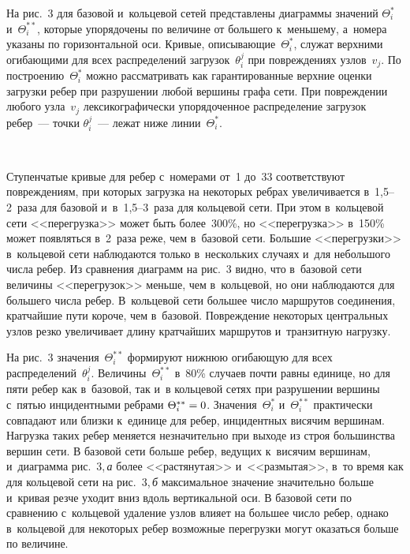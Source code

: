 \begin{multicols}{2}
На рис.~3 для базовой и~кольцевой сетей представлены диаграммы значений 
$\Theta_i^{*}$ и~$\Theta_i^{**}$, которые упорядочены по величине от большего 
к~меньшему, а~номера указаны по горизонтальной оси. Кривые, описывающие~$\Theta_i^{*}$, 
служат верхними огибающими для всех распределений загрузок~$\theta_i^{j}$ 
при по\-вреж\-де\-ни\-ях узлов~$v_j$. По построению~$\Theta_i^{*}$ можно 
рассматривать как гарантированные верхние оценки загрузки ребер при разрушении 
любой вершины графа сети. При по\-вреж\-де\-нии любого узла~$v_j$ лексикографически 
упорядоченное распределение загрузок ребер~--- точки $\theta_i^{j}$~--- лежат 
ниже линии~$\Theta_i^{*}$.

\begin{figure*} %
\vspace*{1pt}
  \begin{center}
 \mbox{%
 \epsfxsize=162.923mm 
 }
\end{center}
\vspace*{-9pt}
\end{figure*}

Ступенчатые кривые для ребер с~номерами от~1 до~33 соответствуют по\-вреж\-де\-ни\-ям, 
при которых загрузка на некоторых ребрах увеличивается \mbox{в~1,5--2}~ра\-за для базовой 
и~в~1,5--3~ра\-за для кольцевой сети. При этом в~кольцевой сети <<перегрузка>> 
может быть более~300\%, но <<перегрузка>> в~150\% может появляться в~2~раза 
реже, чем в~базовой сети. Большие <<перегрузки>> в~кольцевой сети наблюдаются 
только в~нескольких случаях и~для небольшого числа ребер. Из сравнения диаграмм 
на рис.~3 видно, что в~базовой сети величины <<перегрузок>> меньше, чем 
в~кольцевой, но они наблюдаются для большего числа ребер.
В~кольцевой сети большее число маршрутов соединения, кратчайшие пути короче, чем 
в~базовой. Повреждение некоторых центральных  узлов резко увеличивает  длину 
кратчайших маршрутов и~транзитную нагрузку.



На рис.~3 значения~$\Theta_i^{**}$ формируют нижнюю огибающую для всех 
распределений~$\theta_i^{j}$. Величины~$\Theta_i^{**}$ в~80\% случаев почти 
равны единице, но для пяти ребер как в~базовой, так и~в кольцевой сетях при 
разрушении вершины с~пятью инцидентными ребрами $\Theta_i^{**}\hm = 0$.  Значения~$\Theta_i^{*}$ 
и~$\Theta_i^{**}$ практически совпадают или близки к~единице 
для ребер, инцидентных висячим вершинам. Нагрузка таких ребер меняется 
незначительно при выходе из строя большинства вершин сети. В базовой сети больше 
ребер, ведущих к~висячим вершинам, и~диаграмма рис.~3,\,\textit{а} более <<растянутая>> 
и~<<размытая>>, в~то время как для кольцевой сети на рис.~3,\,\textit{б} максимальное 
значение значительно больше и~кривая резче уходит вниз вдоль вертикальной оси.
В базовой сети по сравнению с~кольцевой  удаление узлов влияет на большее число 
ребер, однако в~кольцевой для некоторых ребер возможные перегрузки могут 
оказаться больше по величине.




\end{multicols}
